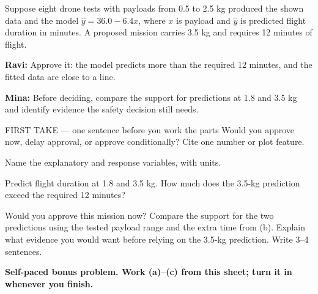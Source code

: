 \documentclass[14pt]{extarticle}
\begin{document}
\pagestyle{empty}


\noindent\begin{minipage}[t]{0.57\linewidth}
\vspace{0pt}
Suppose eight drone tests with payloads from 0.5 to 2.5 kg produced the shown data and the model $\hat y=36.0-6.4x$, where $x$ is payload and $\hat y$ is predicted flight duration in minutes. A proposed mission carries 3.5 kg and requires 12 minutes of flight.\par\smallskip \textbf{Ravi:} Approve it: the model predicts more than the required 12 minutes, and the fitted data are close to a line.\par \textbf{Mina:} Before deciding, compare the support for predictions at 1.8 and 3.5 kg and identify evidence the safety decision still needs.\par
\end{minipage}\hfill
\begin{minipage}[t]{0.40\linewidth}
\vspace{0pt}
\begin{center}
\end{center}
\end{minipage}

\begin{firsttakebox}{FIRST TAKE --- one sentence before you work the parts}
Would you approve now, delay approval, or approve conditionally? Cite one number or plot feature.
\end{firsttakebox}

\begin{description}[leftmargin=1.15in, labelwidth=1in, itemsep=2pt, topsep=2pt]
  \item[\dokbadge{1}~(a)] Name the explanatory and response variables, with units.
  \item[\dokbadge{2}~(b)] Predict flight duration at 1.8 and 3.5 kg. How much does the 3.5-kg prediction exceed the required 12 minutes?
  \item[\dokbadge{3}~(c)] Would you approve this mission now? Compare the support for the two predictions using the tested payload range and the extra time from (b). Explain what evidence you would want before relying on the 3.5-kg prediction. Write 3--4 sentences.
\end{description}

\vfill
\textbf{Self-paced bonus problem. Work (a)--(c) from this sheet; turn it in whenever you finish.}
\end{document}
